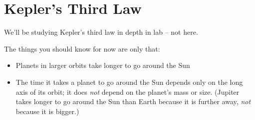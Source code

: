 \documentclass[12pt]{article}
\newcommand{\BI}{\begin{itemize}}
\newcommand{\EI}{\end{itemize}}
\begin{document}
\section{Kepler's Third Law}

We'll be studying Kepler's third law in depth in lab -- not here.

The things you should know for now are only that:

\BI
\item Planets in larger orbits take longer to go around the Sun
\item The time it takes a planet to go around the Sun depends only on the long axis of its orbit; it does {\it not} depend on the planet's mass or size. (Jupiter takes longer to go around the Sun than Earth because it is further away, {\it not} because it is bigger.)
\EI
\end{document}
